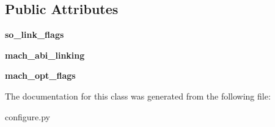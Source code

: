 \subsection*{Public Attributes}
\begin{DoxyCompactItemize}
\item 
\hypertarget{classconfigure_1_1CompilerInfo_a9cbe5ba874563dcf6e35379dd1ab2bc3}{{\bfseries so\-\_\-link\-\_\-flags}}\label{classconfigure_1_1CompilerInfo_a9cbe5ba874563dcf6e35379dd1ab2bc3}

\item 
\hypertarget{classconfigure_1_1CompilerInfo_ab4053523aa4ccb387f72575f1570cf7a}{{\bfseries mach\-\_\-abi\-\_\-linking}}\label{classconfigure_1_1CompilerInfo_ab4053523aa4ccb387f72575f1570cf7a}

\item 
\hypertarget{classconfigure_1_1CompilerInfo_a9f21aaa11be63354abf059ffd115a23f}{{\bfseries mach\-\_\-opt\-\_\-flags}}\label{classconfigure_1_1CompilerInfo_a9f21aaa11be63354abf059ffd115a23f}

\end{DoxyCompactItemize}


The documentation for this class was generated from the following file\-:\begin{DoxyCompactItemize}
\item 
configure.\-py\end{DoxyCompactItemize}

